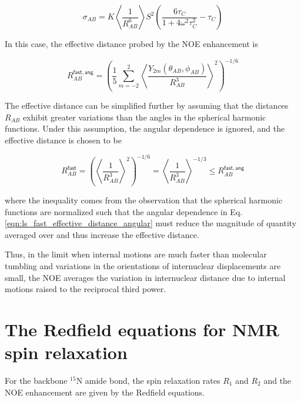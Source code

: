 \documentclass[9pt,review]{livecoms}
\begin{document}
\begin{equation}
\label{eqn:ls_fast_cross_relaxation}
\sigma_{AB} = K \left \langle \frac {1} {R_{AB}^6} \right \rangle S^2 \left( \frac {6 \tau_C} {1 + 4 \omega^2 \tau_C^2} - \tau_C \right)
\end{equation}

\noindent In this case, the effective distance probed by the NOE enhancement is

\begin{equation}
\label{eqn:ls_fast_effective_distance_angular}
R_{AB}^{\mathsf{fast,ang}} = \left( \frac {1} {5} \sum_{m=-2}^2 \left \langle \frac {Y_{2m}(\theta_{AB}, \phi_{AB})} {R_{AB}^3} \right \rangle^2 \right)^{-1/6}
\end{equation}

\noindent The effective distance can be simplified further by assuming that the distances $R_{AB}$ exhibit greater variations than the angles in the spherical harmonic functions.
Under this assumption, the angular dependence is ignored, and the effective distance is chosen to be

\begin{equation}
\label{eqn:ls_fast_effective_distance}
R_{AB}^{\mathsf{fast}} = \left( \left \langle \frac {1} {R_{AB}^3} \right \rangle^2 \right)^{-1/6} = \left \langle \frac {1} {R_{AB}^3} \right \rangle^{-1/3} \leq R_{AB}^{\mathsf{fast,ang}}
\end{equation}

\noindent where the inequality comes from the observation that the spherical harmonic functions are normalized such that the angular dependence in Eq. \ref{eqn:ls_fast_effective_distance_angular} must reduce the magnitude of quantity averaged over and thus increase the effective distance.

Thus, in the limit when internal motions are much faster than molecular tumbling and variations in the orientations of internuclear displacements are small, the NOE averages the variation in internuclear distance due to internal motions raised to the reciprocal third power.

\section{The Redfield equations for NMR spin relaxation}
\label{app:spin_relax_redfield}

For the backbone $^{15}$N amide bond, the spin relaxation rates $R_1$ and $R_2$ and the NOE enhancement are given by the Redfield equations.
\end{document}
